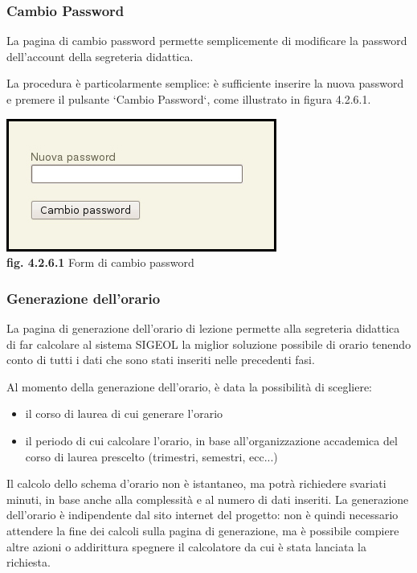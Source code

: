 \documentclass[11pt,a4paper]{article}
\begin{document}
\subsubsection{Cambio Password}
La pagina di cambio password permette semplicemente di modificare la password dell'account della segreteria didattica.

La procedura è particolarmente semplice: è sufficiente inserire la nuova password e premere il pulsante `Cambio Password`, come illustrato in figura 4.2.6.1.

\begin{center}
	\includegraphics[scale=0.5]{images/cambio_password.jpg}\\
	\textbf{fig. 4.2.6.1} Form di cambio password\\
\end{center}


\subsubsection{Generazione dell'orario}
La pagina di generazione dell'orario di lezione permette alla segreteria didattica di far calcolare al sistema SIGEOL la miglior soluzione possibile di orario tenendo conto di tutti i dati che sono stati inseriti nelle precedenti fasi.

Al momento della generazione dell'orario, è data la possibilità di scegliere:
\begin{itemize}
 \item il corso di laurea di cui generare l'orario
 \item il periodo di cui calcolare l'orario, in base all'organizzazione accademica del corso di laurea prescelto (trimestri, semestri, ecc...)
\end{itemize}
Il calcolo dello schema d'orario non è istantaneo, ma potrà richiedere svariati minuti, in base anche alla complessità e al numero di dati inseriti.
La generazione dell'orario è indipendente dal sito internet del progetto: non è quindi necessario attendere la fine dei calcoli sulla pagina di generazione, ma è possibile compiere altre azioni o addirittura spegnere il calcolatore da cui è stata lanciata la richiesta.
\end{document}
